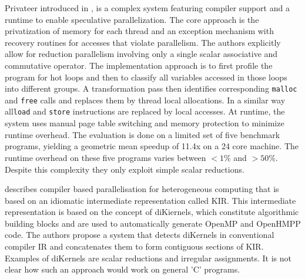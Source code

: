     Privateer introduced in \cite{Johnson:2012:SSP:2254064.2254107}, is a
    complex system featuring compiler support and a runtime to enable
    speculative parallelization.
    The core approach is the privatization of memory for each thread and an
    exception mechanism with recovery routines for accesses that violate
    parallelism.
    The authors explicitly allow for reduction parallelism involving only a
    single scalar associative and commutative operator.
    The implementation approach is to first profile the program for hot loops
    and then to classify all variables accessed in those loops into different
    groups.
    A transformation pass then identifies corresponding \texttt{malloc} and
    \texttt{free} calls and replaces them by thread local allocations.
    In a similar way all\texttt{load} and \texttt{store} instructions are
    replaced by local accesses.
    At runtime, the system uses manual page table switching and memory
    protection to minimize runtime overhead.
    The evaluation is done on a limited set of five benchmark programs, yielding
    a geometric mean speedup of 11.4x on a 24 core machine.
    The runtime overhead on these five programs varies between $<1\%$ and
    $>50\%$.
    Despite this complexity they only exploit simple scalar reductions.

    \citet{Andion2015Compilation} describes compiler based
    parallelisation for heterogeneous computing that is based on
    an idiomatic intermediate representation called KIR.
    This intermediate representation is based on the concept of
    \mbox{diKiernels}, which constitute algorithmic building blocks and are used
    to automatically generate OpenMP and OpenHMPP code.
    The authors propose a system that detects diKernels in conventional compiler
    IR and concatenates them to form contiguous sections of KIR.
    Examples of diKernels are scalar reductions and irregular
    assignments.
    It is not clear how such an approach would work on general 'C' programs.
